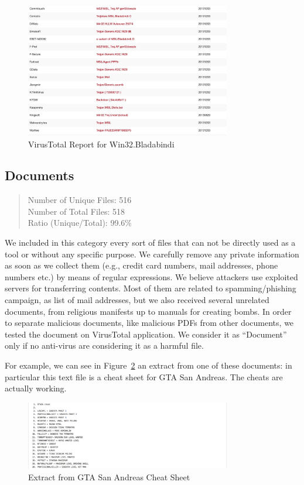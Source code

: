 \begin{figure}[H]
\centerline{\includegraphics[width=0.8\textwidth]{Images/malwareVT.jpg}}
\caption{VirusTotal Report for Win32.Bladabindi\label{fig:malware}}
\end{figure}

\subsection{Documents}

\begin{quote}
Number of Unique Files: 516\\
Number of Total Files: 518\\
Ratio (Unique/Total): 99.6\%
\end{quote}

We included in this category every sort of files that can not be directly used as a tool or without any specific purpose. We carefully remove any private information as soon as we collect them (e.g., credit card numbers, mail addresses, phone numbers etc.) by means of regular expressions. We believe attackers use exploited servers for transferring contents. Most of them are related to spamming/phishing campaign, as list of mail addresses, but we also received several unrelated documents, from religious manifests up to manuals for creating bombs. In order to separate malicious documents, like malicious PDFs from other documents, we tested the document on VirusTotal application. We consider it as ``Document'' only if no anti-virus are considering it as a harmful file.

For example, we can see in Figure~\ref{fig:documentExample} an extract from one of these documents: in particular this text file is a cheat sheet for GTA San Andreas. The cheats are actually working.

\begin{figure}[H]
\centerline{\includegraphics[width=0.8\textwidth]{Images/documentExample.jpg}}
\caption{Extract from GTA San Andreas Cheat Sheet\label{fig:documentExample}}
\end{figure}

